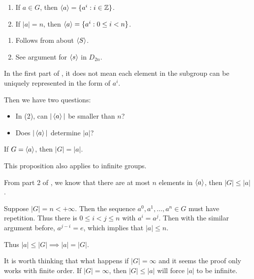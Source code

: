 \begin{lemma}
\begin{enumerate}
	\item If $a\in G$, then $\left\langle a \right\rangle=\{a^i:i\in\mathbb Z\}$.
	\item If $|a|=n$, then $\left\langle a \right\rangle=\{a^i:0\le i < n\}$.
\end{enumerate}
\end{lemma}

\begin{pf}
\begin{enumerate}
\item Follows from  about $\left\langle S \right\rangle$.
\item See argument for $\left\langle s \right\rangle$ in $D_{2n}$.
\end{enumerate}
\end{pf}
\begin{remark}
In the first part of , it does not mean each element in the subgroup can  be uniquely represented in the form of $a^i$.
\end{remark}
Then we have two questions:
\begin{itemize}
	\item In (2), can $|\left\langle a \right\rangle|$ be smaller than $n$?
	\item Does $|\left\langle a \right\rangle|$ determine $|a|$?
\end{itemize}

\begin{prop}
If $G=\left\langle a \right\rangle$, then $|G|=|a|$.
\end{prop}

This proposition also applies to infinite groups.

\begin{pf}
From part 2 of , we know that there are at most $n$ elements in $\left\langle a \right\rangle$, then $|G|\le |a|$.

Suppose $|G|=n< +\infty$. Then the sequence $a^0,a^1,\ldots,a^n\in G$ must have repetition. Thus there is $0\le i<j\le n$ with $a^i=a^j$. Then with the similar argument before, $a^{j-i}=e$, which implies that $|a|\le n$.

Thus $|a|\le |G| \implies |a|=|G|$.
\end{pf}

\begin{remark}
It is worth thinking that what happens if $|G|=\infty$ and it seems the proof only works with finite order. If $|G|=\infty$, then $|G|\le |a|$ will force $|a|$ to be infinite.
\end{remark}

